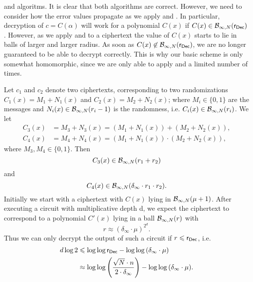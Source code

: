 \begin{paralgorithm}{ and  algoritms.}
	It is clear that both algorithms are correct. However, we need to consider how the error values propagate as we apply  and . 
	In particular, decryption of $c = C(\alpha)$ will work for a polynomial $C(x)$ if $C(x) \in \mathcal{B}_{\infty, N}(\textsf{r}_{\textsf{Dec}})$. 
	However, as we apply  and  to a ciphertext the value of $C(x)$ starts to lie in balls of larger and larger radius. 
	As soon as $C(x) \not\in \mathcal{B}_{\infty, N}(\textsf{r}_{\textsf{Dec}})$, we are no longer guaranteed to be able to decrypt correctly.
	This is why our basic scheme is only somewhat homomorphic, since we are only able to apply  and  a limited number of times.
	
	Let $c_1$ and $c_2$ denote two ciphertexts, corresponding to two randomizations $C_1(x) = M_1+N_1(x)$ and $C_2(x) = M_2+N_2(x)$; where $M_i \in \{0, 1\}$ are the messages and $N_i(x) \in \mathcal{B}_{\infty, N}(r_i-1)$ is the randomness, i.e. $C_i(x) \in \mathcal{B}_{\infty, N}(r_i)$. 
	We let
	\begin{align*}
	C_3(x) &= M_3+N_3(x) = (M_1+N_1(x)) + (M_2+N_2(x)),\\
	C_4(x) &= M_4+N_4(x) = (M_1+N_1(x)) \cdot (M_2+N_2(x)),
	\end{align*} %
	where $M_3, M_4 \in \{0, 1\}$. Then
	\[
	C_3(x) \in \mathcal{B}_{\infty, N}(r_1+r_2)
	\]
	and
	\[
	C_4(x) \in \mathcal{B}_{\infty, N}(\delta_\infty \cdot r_1 \cdot r_2).
	\]
	Initially we start with a ciphertext with $C(x)$ lying in $\mathcal{B}_{\infty, N}(\mu + 1)$.
	After executing a circuit with multiplicative depth d, we expect the ciphertext to correspond to a polynomial $C'(x)$ lying in a ball $\mathcal{B}_{\infty, N}(r)$ with
	\[
	r \approx (\delta_\infty \cdot \mu)^{2^d}.
	\]
	Thus we can only decrypt the output of such a circuit if $r \leqslant \textsf{r}_{\textsf{Dec}}$, i.e.
	\begin{align*}
	d \log 2 &\leqslant \log{\log{\textsf{r}_{\textsf{Dec}}}} - \log{\log{(\delta_\infty \cdot \mu)}} 
	\\ &\approx \log{\log{\left(\frac{\sqrt{N} \cdot n}{2 \cdot \delta_\infty}\right)}} - \log{\log{(\delta_\infty \cdot \mu)}}.
	\end{align*}
\end{paralgorithm}
